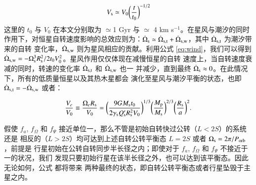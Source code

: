 \begin{equation} \label{eq:wind}
V_\mathrm{s} \simeq  V_0 \bigg( \frac{t}{t_0} \bigg)^{-1/2}
\end{equation} 
这里的 $t_0$ 与 $V_0$ 在本文分别取为 $\simeq$1 Gyr 与 $\simeq$ 4 km s$^{-1}$。在星风与潮汐的同时
作用下\cite{DobbsDixon2004,Dawson2014}，对恒星自转速度影响的总效应则为：$\dot{\Omega}_\mathrm{s} 
\simeq \dot{\Omega}_\mathrm{s, t} + \dot{\Omega}_\mathrm{s, w}$，其中 $\dot{\Omega}_\mathrm{s, t}$ 为潮汐带来的自转
变化率，$\dot{\Omega}_\mathrm{s, w}$ 则为星风相应的贡献。利用公式 \ref{eq:wind}，我们可以得到 
$\dot{\Omega}_\mathrm{s, w} = -\Omega_\mathrm{s}^3 R_\mathrm{s}^2/2 t_0 V_0^2$。星风作用仅仅体现在减慢恒星的自转
速度上，当自转速度衰减的同时，转速的变化率 $ \dot{\Omega}_\mathrm{s, t}$ 和 $\dot{\Omega}_\mathrm{s, w}$ 也一
并减少，直到最终 $ \dot{\Omega}_\mathrm{s} \approx 0 $。在此情况下，所有的低质量恒星以及其热木星都会
演化至星风与潮汐平衡的状态，也即 $\dot{\Omega}_\mathrm{s, t} = - \dot{\Omega}_\mathrm{s, w}$ 或者：

\begin{equation} \label{eq:lmeq}
{V_e \over V_0} \equiv \frac{\Omega_eR_\mathrm{s}}{V_0} = \bigg( \frac{9G M_\mathrm{s}t_0}
{2 \gamma_\mathrm{s}Q_\mathrm{s}^{\prime}R_\mathrm{s}^2V_0} \bigg)^{1/3} \bigg( \frac{M_\mathrm{p}}
{M_\mathrm{s}} \bigg)^{2/3} \bigg( \frac{R_\mathrm{s}}{a} \bigg)^2.
\end{equation}  

假使 $f_a$, $f_\Omega$ 和 $f_\Psi$ 接近单位一，那么不管是初始自转快过公转（$L<2S$）的系统还是
相反的（$L>2S$）均可达到上述自转公转平衡态 $L=2S$ 或者 $\Omega_\mathrm{s} = 2\pi /P_\mathrm{orb}$，前提是
行星初始在公转自转同步半长径之内；即使对于 $f_a$, $f_\Omega$ 和 $f_\Psi$ 不接近于一的状况，我们
发现只要初始行星在该半长径之外，也可以达到该平衡态。因此无论如何，公式 \label{eq:lmeq} 都将带来
两种最终的状态，即自转公转平衡态或者行星坠毁于主星之内。

